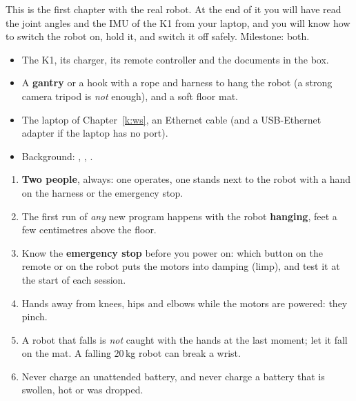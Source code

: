 \label{k:box}

This is the first chapter with the real robot. At the end of it you will have read the joint angles and the IMU of the K1 from your laptop, and you will know how to switch the robot on, hold it, and switch it off safely. Milestone: both.

\begin{needbox}
\begin{itemize}[nosep]
  \item The K1, its charger, its remote controller and the documents in the box.
  \item A \textbf{gantry} or a hook with a rope and harness to hang the robot (a strong camera tripod is \emph{not} enough), and a soft floor mat.
  \item The laptop of Chapter~\ref{k:ws}, an Ethernet cable (and a USB-Ethernet adapter if the laptop has no port).
  \item Background: , , .
\end{itemize}
\end{needbox}

\begin{safetybox}
\begin{enumerate}[nosep]
  \item \textbf{Two people}, always: one operates, one stands next to the robot with a hand on the harness or the emergency stop.
  \item The first run of \emph{any} new program happens with the robot \textbf{hanging}, feet a few centimetres above the floor.
  \item Know the \textbf{emergency stop} before you power on: which button on the remote or on the robot puts the motors into damping (limp)\guess, and test it at the start of each session.
  \item Hands away from knees, hips and elbows while the motors are powered: they pinch.
  \item A robot that falls is \emph{not} caught with the hands at the last moment; let it fall on the mat. A falling $20$\,kg robot can break a wrist.
  \item Never charge an unattended battery, and never charge a battery that is swollen, hot or was dropped.
\end{enumerate}
\end{safetybox}

